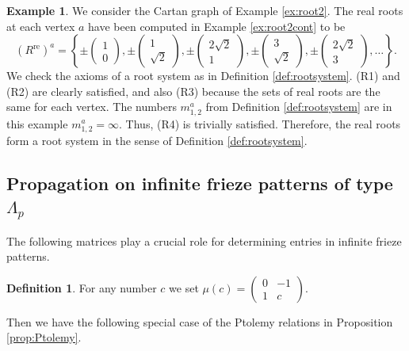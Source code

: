\documentclass[11pt,a4paper]{amsart}
\theoremstyle{definition}
\newtheorem{Definition}[Lemma]{Definition}
\newtheorem{Example}[Lemma]{Example}
\numberwithin{equation}{section}
\begin{document}
\begin{Example}
    We consider the Cartan graph of Example 
    \ref{ex:root2}. The real roots at each vertex $a$ have been computed in 
    Example \ref{ex:root2cont} to be
    $$(R^{\mathrm{re}})^a =
    \left\{ \pm \begin{pmatrix} 1\\0
    \end{pmatrix}, \pm \begin{pmatrix} 1\\\sqrt{2} \end{pmatrix}, \pm \begin{pmatrix} 2\sqrt{2}\\1
    \end{pmatrix}, \pm \begin{pmatrix} 3\\\sqrt{2} \end{pmatrix},
    \pm \begin{pmatrix} 2\sqrt{2}\\ 3 \end{pmatrix},\ldots
    \right\}.
    $$ 
    We check the axioms of a root system
    as in Definition \ref{def:rootsystem}. 
    (R1) and (R2) are clearly satisfied, and
    also (R3) because the sets of real roots
    are the same for each vertex. The numbers $m_{1,2}^a$ from
    Definition \ref{def:rootsystem} are in this example $m_{1,2}^a= \infty$. 
    Thus, (R4) is trivially satisfied. Therefore,
    the real
    roots form a root system in the
    sense of Definition \ref{def:rootsystem}. 
\end{Example}



\subsection{Propagation on infinite frieze patterns of type $\Lambda_p$}

The following matrices play a crucial role for 
determining entries in infinite frieze patterns.

\begin{Definition}
For any number $c$ we set
$\mu(c) = \begin{pmatrix} 0 & -1 \\ 1 & c \end{pmatrix}.
$
\end{Definition}

Then we have the following special case of 
the Ptolemy relations in Proposition
\ref{prop:Ptolemy}. 
\end{document}

